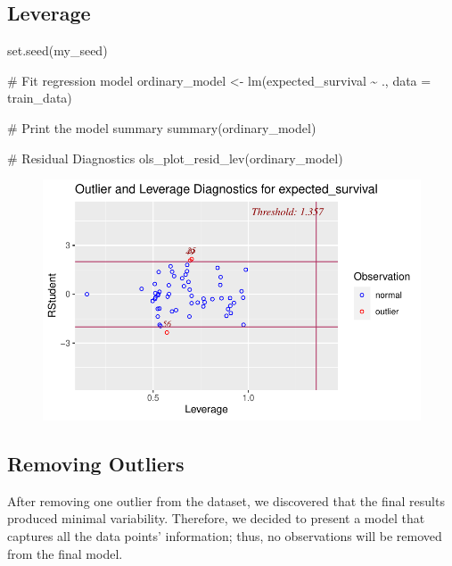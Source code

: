 \documentclass[
  letterpaper,
  DIV=11,
  numbers=noendperiod]{scrreprt}
\newenvironment{Shaded}{\begin{snugshade}}{\end{snugshade}}
\newcommand{\AttributeTok}[1]{\textcolor[rgb]{0.40,0.45,0.13}{#1}}
\newcommand{\CommentTok}[1]{\textcolor[rgb]{0.37,0.37,0.37}{#1}}
\newcommand{\FunctionTok}[1]{\textcolor[rgb]{0.28,0.35,0.67}{#1}}
\newcommand{\NormalTok}[1]{\textcolor[rgb]{0.00,0.23,0.31}{#1}}
\newcommand{\OtherTok}[1]{\textcolor[rgb]{0.00,0.23,0.31}{#1}}
\newcommand{\SpecialCharTok}[1]{\textcolor[rgb]{0.37,0.37,0.37}{#1}}
\begin{document}
\hypertarget{leverage}{%
\subsection{Leverage}\label{leverage}}

\begin{Shaded}
\begin{Highlighting}[]
\FunctionTok{set.seed}\NormalTok{(my\_seed)}

\CommentTok{\# Fit regression model}
\NormalTok{ordinary\_model }\OtherTok{\textless{}{-}} \FunctionTok{lm}\NormalTok{(expected\_survival }\SpecialCharTok{\textasciitilde{}}\NormalTok{ ., }\AttributeTok{data =}\NormalTok{ train\_data)}

\CommentTok{\# Print the model summary}
\FunctionTok{summary}\NormalTok{(ordinary\_model)}

\CommentTok{\# Residual Diagnostics}
\FunctionTok{ols\_plot\_resid\_lev}\NormalTok{(ordinary\_model)}
\end{Highlighting}
\end{Shaded}

\begin{figure}[H]

{\centering \includegraphics{analysis_files/figure-pdf/unnamed-chunk-11-1.pdf}

}

\end{figure}

\hypertarget{removing-outliers}{%
\subsection{Removing Outliers}\label{removing-outliers}}

After removing one outlier from the dataset, we discovered that the
final results produced minimal variability. Therefore, we decided to
present a model that captures all the data points' information; thus, no
observations will be removed from the final model.
\end{document}
